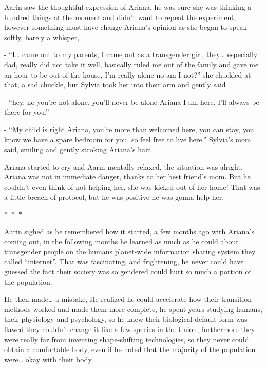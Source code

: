 \documentclass[hidelinks,12pt,a4paper]{book}
\newcommand\sep{\begin{center}
  \boldmath $\ast$~$\ast$~$\ast$
\end{center}}
\begin{document}
Aarin saw the thoughtful expression of Ariana, he was sure she was thinking a hundred 
things at the moment and didn't want to repeat the experiment, however something must have change 
Ariana's opinion as she began to speak softly, barely a whisper, \par
\bigskip

- “I… came out to my parents, I came out as a transgender girl, they… especially dad, 
really did not take it well, basically ruled me out of the family and gave me an hour to be out 
of the house, I'm really alone no am I not?” she chuckled at that, a sad chuckle, 
but Sylvia took her into their arm and gently said\par
\bigskip
- “hey, no you're not alone, you'll never be alone Ariana I am here, I'll always be there for you.”\par
\bigskip
- “My child is right Ariana, you're more than welcomed here, you can stay,
 you know we have a spare bedroom for you, so feel free to live here.” Sylvia's mom said,
  smiling and gently stroking Ariana's hair.\par
  \bigskip

Ariana started to cry and Aarin mentally relaxed, the situation was alright, 
Ariana was not in immediate danger, thanks to her best friend's mom.
 But he couldn't even think of not helping her, she was kicked out of her home! That was a little breach of protocol,
 but he was positive he was gonna help her.

 \sep

Aarin sighed as he remembered how it started, a few months ago with Ariana's coming out, in the following months he 
learned as much as he could about transgender people on the humans planet-wide information sharing system 
they called “internet”. That was fascinating, and frightening, he never could have guessed the fact their 
society was so gendered could hurt so much a portion of the population.\par
\bigskip

He then made… a mistake, He realized he could accelerate how their transition methods worked and 
made them more complete, he spent years studying humans, their physiology and psychology, so he knew their 
biological default form was flawed they couldn't change it like a few species in the Union, furthermore they were really far 
from inventing shape-shifting technologies, so they never could obtain a comfortable body, even if he noted
 that the majority of the population were… okay with their body. \par
 \bigskip
\end{document}
